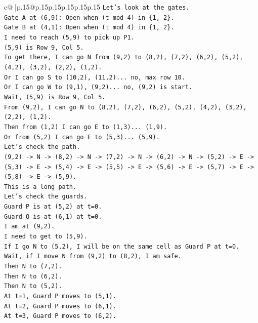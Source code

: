 \documentclass{article}
\begin{document}
{\begin{supertabular}{c@{$\;$}|p{.15\linewidth}@{}p{.15\linewidth}p{.15\linewidth}p{.15\linewidth}p{.15\linewidth}p{.15\linewidth}}
{{{\texttt{Let's look at the gates.} \\
\texttt{Gate A at (6,9): Open when (t mod 4) in \{1, 2\}.} \\
\texttt{Gate B at (4,1): Open when (t mod 4) in \{1, 2\}.} \\
\texttt{I need to reach (5,9) to pick up P1.} \\
\texttt{(5,9) is Row 9, Col 5.} \\
\texttt{To get there, I can go N from (9,2) to (8,2), (7,2), (6,2), (5,2), (4,2), (3,2), (2,2), (1,2).} \\
\texttt{Or I can go S to (10,2), (11,2)... no, max row 10.} \\
\texttt{Or I can go W to (9,1), (9,2)... no, (9,2) is start.} \\
\texttt{Wait, (5,9) is Row 9, Col 5.} \\
\texttt{From (9,2), I can go N to (8,2), (7,2), (6,2), (5,2), (4,2), (3,2), (2,2), (1,2).} \\
\texttt{Then from (1,2) I can go E to (1,3)... (1,9).} \\
\texttt{Or from (5,2) I can go E to (5,3)... (5,9).} \\
\texttt{Let's check the path.} \\
\texttt{(9,2) {-}> N {-}> (8,2) {-}> N {-}> (7,2) {-}> N {-}> (6,2) {-}> N {-}> (5,2) {-}> E {-}> (5,3) {-}> E {-}> (5,4) {-}> E {-}> (5,5) {-}> E {-}> (5,6) {-}> E {-}> (5,7) {-}> E {-}> (5,8) {-}> E {-}> (5,9).} \\
\texttt{This is a long path.} \\
\texttt{Let's check the guards.} \\
\texttt{Guard P is at (5,2) at t=0.} \\
\texttt{Guard Q is at (6,1) at t=0.} \\
\texttt{I am at (9,2).} \\
\texttt{I need to get to (5,9).} \\
\texttt{If I go N to (5,2), I will be on the same cell as Guard P at t=0.} \\
\texttt{Wait, if I move N from (9,2) to (8,2), I am safe.} \\
\texttt{Then N to (7,2).} \\
\texttt{Then N to (6,2).} \\
\texttt{Then N to (5,2).} \\
\texttt{At t=1, Guard P moves to (5,1).} \\
\texttt{At t=2, Guard P moves to (6,1).} \\
\texttt{At t=3, Guard P moves to (6,2).} \\
}}}
\end{supertabular}}
\end{document}
